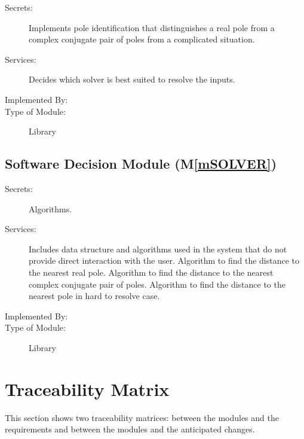 \documentclass[12pt, titlepage]{article}
\newcommand{\mref}[1]{M\ref{#1}}
\begin{document}
\begin{description}
\item[Secrets:] Implements pole identification that distinguishes a real pole from
  a complex conjugate pair of poles from a complicated situation.
\item[Services:] Decides which solver is best suited to resolve the inputs.
\item[Implemented By:] 
\item[Type of Module:] Library
\end{description}

\subsection{Software Decision Module (\mref{mSOLVER})}

\begin{description}
\item[Secrets:] Algorithms.
\item[Services:] Includes data structure and algorithms used in the system that
  do not provide direct interaction with the user.
  Algorithm to find the distance to the nearest real pole.
  Algorithm to find the distance to the nearest complex conjugate pair of poles.
  Algorithm to find the distance to the nearest pole in hard to resolve case.
\item[Implemented By:] 
\item[Type of Module:] Library
\end{description}

\section{Traceability Matrix} \label{SecTM}

This section shows two traceability matrices: between the modules and the
requirements and between the modules and the anticipated changes.
\end{document}
